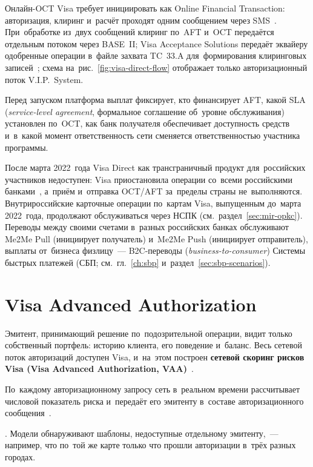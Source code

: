 Онлайн-OCT Visa требует инициировать как Online Financial Transaction:
авторизация, клиринг и~расчёт проходят одним сообщением через
SMS~\cite{visa-core-rules}. При~обработке из~двух сообщений клиринг
по~AFT и~OCT передаётся отдельным потоком через BASE~II;
Visa Acceptance Solutions передаёт эквайеру одобренные операции в~файле захвата
TC~33.A для~формирования клиринговых записей~\cite{visa-tc33a-capture-file};
схема на~рис.~\ref{fig:visa-direct-flow} отображает только авторизационный
поток V.I.P.~System.

Перед запуском платформа выплат фиксирует, кто финансирует
AFT, какой SLA (\textit{service-level agreement}, формальное соглашение
об~уровне обслуживания) установлен по~OCT, как банк получателя обеспечивает
доступность средств и~в~какой момент ответственность сети сменяется
ответственностью участника программы.

После марта 2022~года Visa Direct как трансграничный продукт для~российских
участников недоступен: Visa приостановила операции со~всеми российскими банками~\cite{visa-russia-suspension-2022},
а~приём и~отправка OCT/AFT за~пределы страны не~выполняются. Внутрироссийские
карточные операции по~картам Visa, выпущенным до~марта 2022~года, продолжают
обслуживаться через НСПК (см.~раздел~\ref{sec:mir-opkc}). Переводы между
своими счетами в~разных российских банках обслуживают Me2Me Pull (инициирует
получатель) и~Me2Me Push (инициирует отправитель), выплаты от~бизнеса
физлицу~--- B2C-переводы
(\textit{business-to-consumer}) Системы быстрых платежей (СБП;
см.~гл.~\ref{ch:sbp} и~раздел~\ref{sec:sbp-scenarios}).

\section{Visa Advanced Authorization}\label{sec:visa-vaa}

Эмитент, принимающий решение по~подозрительной операции, видит только
собственный портфель: историю клиента, его поведение и~баланс. Весь сетевой
поток авторизаций доступен Visa, и~на~этом построен \textbf{сетевой скоринг
рисков Visa (Visa Advanced Authorization, VAA)}~\cite{visa-core-rules,visa-vaa}.

По~каждому авторизационному запросу сеть в~реальном времени рассчитывает
числовой показатель риска и~передаёт его эмитенту в~составе
авторизационного сообщения~\cite{visa-vaa}.

. Модели
обнаруживают шаблоны, недоступные отдельному эмитенту,~--- например, что
по~той же карте только что прошли авторизации в~трёх разных городах.

